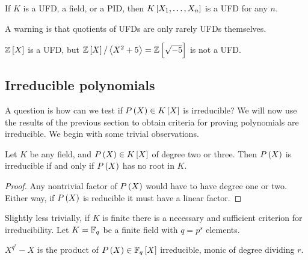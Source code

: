 \begin{corollary}
If $ K $ is a UFD, a field, or a PID, then $ K\sbr{X_1, \dots, X_n} $ is a UFD for any $ n $.
\end{corollary}

A warning is that quotients of UFDs are only rarely UFDs themselves.

\begin{example*}
$ \ZZ\sbr{X} $ is a UFD, but $ \ZZ\sbr{X} / \abr{X^2 + 5} = \ZZ\sbr{\sqrt{-5}} $ is not a UFD.
\end{example*}

\subsection{Irreducible polynomials}


A question is how can we test if $ P\br{X} \in K\sbr{X} $ is irreducible? We will now use the results of the previous section to obtain criteria for proving polynomials are irreducible. We begin with some trivial observations.

\begin{lemma}
Let $ K $ be any field, and $ P\br{X} \in K\sbr{X} $ of degree two or three. Then $ P\br{X} $ is irreducible if and only if $ P\br{X} $ has no root in $ K $.
\end{lemma}

\begin{proof}
Any nontrivial factor of $ P\br{X} $ would have to have degree one or two. Either way, if $ P\br{X} $ is reducible it must have a linear factor.
\end{proof}

\pagebreak

Slightly less trivially, if $ K $ is finite there is a necessary and sufficient criterion for irreducibility. Let $ K = \mathbb{F}_q $ be a finite field with $ q = p^s $ elements.

\begin{lemma}
$ X^{q^r} - X $ is the product of $ P\br{X} \in \FF_q\sbr{X} $ irreducible, monic of degree dividing $ r $.
\end{lemma}

